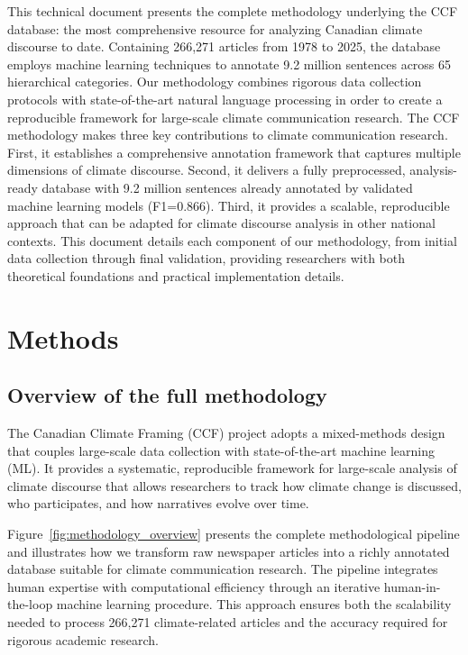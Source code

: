 \documentclass[12pt]{article}
\begin{document}
This technical document presents the complete methodology underlying the CCF database: the most comprehensive resource for analyzing Canadian climate discourse to date. Containing 266,271 articles from 1978 to 2025, the database employs machine learning techniques to annotate 9.2 million sentences across 65 hierarchical categories. Our methodology combines rigorous data collection protocols with state-of-the-art natural language processing in order to create a reproducible framework for large-scale climate communication research. The CCF methodology makes three key contributions to climate communication research. First, it establishes a comprehensive annotation framework that captures multiple dimensions of climate discourse. Second, it delivers a fully preprocessed, analysis-ready database with 9.2 million sentences already annotated by validated machine learning models (F1=0.866). Third, it provides a scalable, reproducible approach that can be adapted for climate discourse analysis in other national contexts. This document details each component of our methodology, from initial data collection through final validation, providing researchers with both theoretical foundations and practical implementation details.

\section{Methods}

\subsection{Overview of the full methodology}

The Canadian Climate Framing (CCF) project adopts a mixed-methods design that couples large-scale data collection with state-of-the-art machine learning (ML). It provides a systematic, reproducible framework for large-scale analysis of climate discourse that allows researchers to track how climate change is discussed, who participates, and how narratives evolve over time.

Figure~\ref{fig:methodology_overview} presents the complete methodological pipeline and illustrates how we transform raw newspaper articles into a richly annotated database suitable for climate communication research. The pipeline integrates human expertise with computational efficiency through an iterative human-in-the-loop machine learning procedure. This approach ensures both the scalability needed to process 266,271 climate-related articles and the accuracy required for rigorous academic research.
\end{document}
